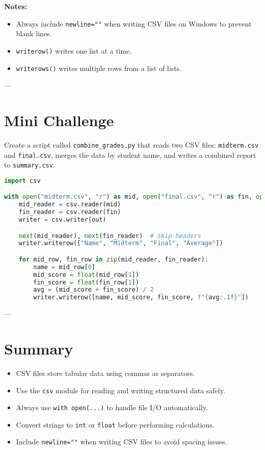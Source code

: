 \textbf{Notes:}
\begin{itemize}
  \item Always include \texttt{newline=""} when writing CSV files on Windows to prevent blank lines.
  \item \texttt{writerow()} writes one list at a time.
  \item \texttt{writerows()} writes multiple rows from a list of lists.
\end{itemize}

---

\section{Mini Challenge}

Create a script called \texttt{combine\_grades.py} that reads two CSV files:  
\texttt{midterm.csv} and \texttt{final.csv}, merges the data by student name,  
and writes a combined report to \texttt{summary.csv}.

\begin{lstlisting}[language=Python, caption={Combining two CSV files.}]
import csv

with open("midterm.csv", "r") as mid, open("final.csv", "r") as fin, open("summary.csv", "w", newline="") as out:
    mid_reader = csv.reader(mid)
    fin_reader = csv.reader(fin)
    writer = csv.writer(out)

    next(mid_reader), next(fin_reader)  # skip headers
    writer.writerow(["Name", "Midterm", "Final", "Average"])

    for mid_row, fin_row in zip(mid_reader, fin_reader):
        name = mid_row[0]
        mid_score = float(mid_row[1])
        fin_score = float(fin_row[1])
        avg = (mid_score + fin_score) / 2
        writer.writerow([name, mid_score, fin_score, f"{avg:.1f}"])
\end{lstlisting}

---

\section*{Summary}
\begin{itemize}
  \item CSV files store tabular data using commas as separators.
  \item Use the \texttt{csv} module for reading and writing structured data safely.
  \item Always use \texttt{with open(...)} to handle file I/O automatically.
  \item Convert strings to \texttt{int} or \texttt{float} before performing calculations.
  \item Include \texttt{newline=""} when writing CSV files to avoid spacing issues.
\end{itemize}
